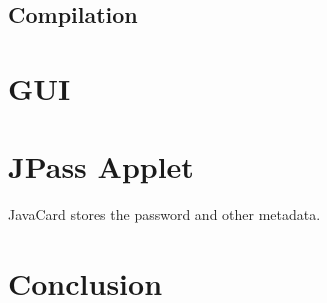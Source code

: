 \documentclass[paper=a4, fontsize=12pt]{scrartcl}
\begin{document}
\subsection{Compilation}
\section{GUI}

\section{JPass Applet}
JavaCard stores the password and other metadata.

\section{Conclusion}
\end{document}
